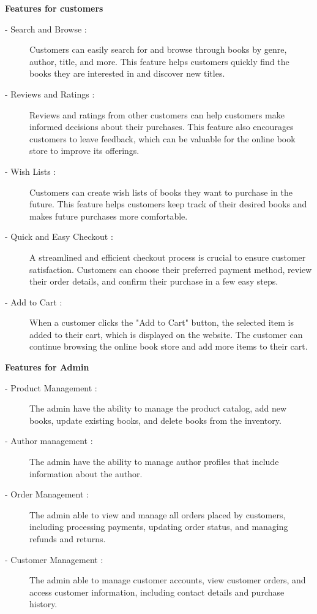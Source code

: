\documentclass[12pt,a4paper]{article}
\begin{document}
{\large\textbf{Features for customers}}
\begin{description}
    \item[\hspace{7mm}- Search and Browse :] Customers can easily search for and browse through books by genre, author, title, and more. This feature helps customers quickly find the books they are interested in and discover new titles.
    \item[\hspace{7mm}- Reviews and Ratings :] Reviews and ratings from other customers can help customers make informed decisions about their purchases. This feature also encourages customers to leave feedback, which can be valuable for the online book store to improve its offerings.
    \item[\hspace{7mm}- Wish Lists :] Customers can create wish lists of books they want to purchase in the future. This feature helps customers keep track of their desired books and makes future purchases more comfortable.
    \item[\hspace{7mm}- Quick and Easy Checkout :] A streamlined and efficient checkout process is crucial to ensure customer satisfaction. Customers can choose their preferred payment method, review their order details, and confirm their purchase in a few easy steps.
    \item[\hspace{7mm}- Add to Cart :] When a customer clicks the "Add to Cart" button, the selected item is added to their cart, which is displayed on the website. The customer can continue browsing the online book store and add more items to their cart.
\end{description}

\vspace{5mm}
{\large\textbf{Features for Admin}}
\begin{description}
    \item[\hspace{7mm}- Product Management :] The admin have the ability to manage the product catalog, add new books, update existing books, and delete books from the inventory.
    \item[\hspace{7mm}- Author management :] The admin have the ability to manage author profiles that include information about the author.
    \item[\hspace{7mm}- Order Management :] The admin able to view and manage all orders placed by customers, including processing payments, updating order status, and managing refunds and returns.
    \item[\hspace{7mm}- Customer Management :] The admin able to manage customer accounts, view customer orders, and access customer information, including contact details and purchase history.
\end{description}
\end{document}
